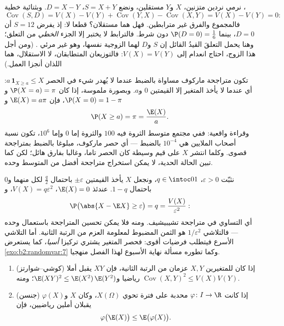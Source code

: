 \begin{example}\label{ex:b2:randomvar:sumdiff}
نرمي نردين متزنين، $X$ و$Y$ مستقلين، ونضع $S = X +
Y$، $D = X - Y$.
وبثنائية خطية ،
\[
\operatorname{Cov}(S, D) = V(X) - V(Y) +
\operatorname{Cov}(Y, X) - \operatorname{Cov}(X, Y) = V(X) -
V(Y) = 0 :
\]
فالمجموع والفرق غير مترابطين. فهل هما مستقلان؟ قطعا لا: إذ يفرض
$S = 12$ أن $D = 0$، بينما $\P(D = 0) =
\frac16$ دون شرط. فالترابط لا يختبر إلا
الجزء \emph{الخطي} من التعلق؛ وهنا يحمل التعلقَ القيدُ القائل إن
$S$ و$D$ لهما الزوجية نفسها، وهو غير مرئي . (ومن أجل
هذا الزوج، احتاج انعدام  إلى $V(X) = V(Y)$: فالتوزيعان المتطابقان،
لا الاستقلال، هما اللذان أنجزا العمل.)
\end{example}

\begin{example}\label{ex:b2:randomvar:markovsharp}
تكون متراجحة ماركوف مساواة بالضبط عندما لا يُهدر شيء في الحصر $a\,\mathbf 1_{X\geq a} \leq X$:
أي عندما لا يأخذ المتغير إلا القيمتين $0$ و$a$. وبصورة ملموسة،
إذا كان $\P(X = a) = \pi$ و$\P(X = 0) = 1 - \pi$، فإن $\E(X)
= a\pi$ و
\[
\P(X \geq a) = \pi = \frac{\E(X)}{a} .
\]
وقراءة واقعية: ففي مجتمع متوسط الثروة فيه $100$ والثروة إما $0$
وإما $10^6$، تكون نسبة أصحاب الملايين هي $10^{-4}$ بالضبط --- أي حصر
ماركوف، مبلوغا بالضبط بمتراجحة قصوى. وكلما انتشر $X$ على قيم
وسيطة كان الحصر تاما، وغالبا بفارق هائل؛ لكن كما تبين الحالة الحدية،
لا يمكن استخراج متراجحة أفضل من المتوسط وحده.
\end{example}

\begin{example}\label{ex:b2:randomvar:chebsharp}
نثبّت $\varepsilon > 0$، $q \in \intoc01$، ونجعل $X$ يأخذ القيمتين $\pm\varepsilon$ باحتمال
$\frac q2$ لكل منهما و$0$ باحتمال $1 - q$. عندئذ $\E(X) = 0$، $V(X) =
q\varepsilon^2$، و
\[
\P\bigl(\abs{X - \E X} \geq \varepsilon\bigr) = q
= \frac{V(X)}{\varepsilon^2} :
\]
أي التساوي في متراجحة تشيبيشيف. ومنه فلا يمكن تحسين المتراجحة
باستعمال  وحده --- فالتلاشي $1/\varepsilon^2$ هو الثمن المضبوط لمعلومة
العزم من الرتبة الثانية. أما التلاشي الأسرع فيتطلب فرضيات أقوى:
فحصر المتغير يشتري تركيزا \emph{أسيا}، كما يستعرض \cref{exo:b2:randomvar:7} وكما تطوره
مسألة نهاية الأسبوع لهذا الفصل منهجيا.
\end{example}

\begin{theorem}\label{thm:b2:randomvar:jensen}
\leavevmode
\begin{enumerate}
\item (كوشي--شوارتز) إذا كان للمتغيرين $X, Y$ عزمان من الرتبة الثانية، فإن
$XY$ يقبل أملا رياضيا و$\E(XY)^2 \leq \E(X^2)\,\E(Y^2)$؛ ومنه $\operatorname{Cov}(X,Y)^2 \leq V(X)V(Y)$.
\item (جنسن) إذا كانت $\varphi \colon I \to \R$ محدبة على فترة تحوي $X(\Omega)$، وكان
$X$ و$\varphi(X)$ يقبلان أملين رياضيين، فإن
\[
\varphi\bigl(\E(X)\bigr) \leq \E\bigl(\varphi(X)\bigr) .
\]
\end{enumerate}
\end{theorem}

